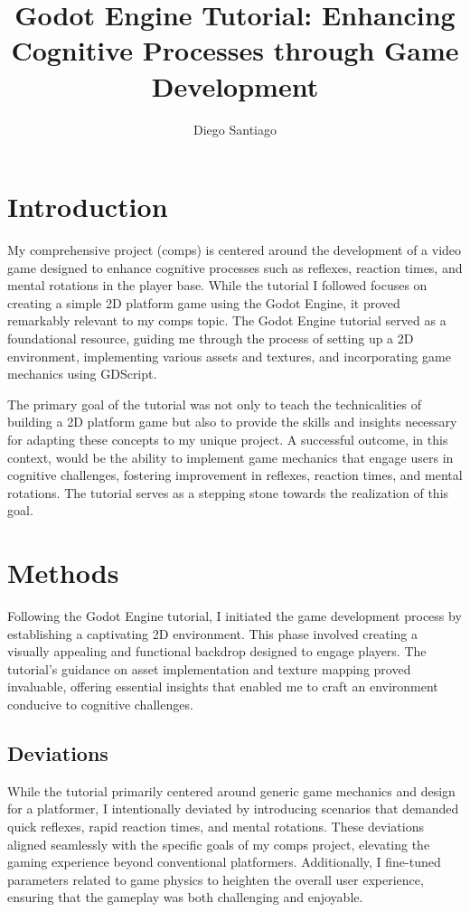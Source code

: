 \documentclass[10pt,twocolumn]{article}
\title{Godot Engine Tutorial: Enhancing Cognitive Processes through Game Development}
\author{Diego Santiago}
\affiliation{Occidental College}
\begin{document}
\maketitle

\section{Introduction}
My comprehensive project (comps) is centered around the development of a video game designed to enhance cognitive processes such as reflexes, reaction times, and mental rotations in the player base. While the tutorial I followed focuses on creating a simple 2D platform game using the Godot Engine, it proved remarkably relevant to my comps topic. The Godot Engine tutorial served as a foundational resource, guiding me through the process of setting up a 2D environment, implementing various assets and textures, and incorporating game mechanics using GDScript.

The primary goal of the tutorial was not only to teach the technicalities of building a 2D platform game but also to provide the skills and insights necessary for adapting these concepts to my unique project. A successful outcome, in this context, would be the ability to implement game mechanics that engage users in cognitive challenges, fostering improvement in reflexes, reaction times, and mental rotations. The tutorial serves as a stepping stone towards the realization of this goal.

\section{Methods}
Following the Godot Engine tutorial, I initiated the game development process by establishing a captivating 2D environment. This phase involved creating a visually appealing and functional backdrop designed to engage players. The tutorial's guidance on asset implementation and texture mapping proved invaluable, offering essential insights that enabled me to craft an environment conducive to cognitive challenges.
\subsection{Deviations}
While the tutorial primarily centered around generic game mechanics and design for a platformer, I intentionally deviated by introducing scenarios that demanded quick reflexes, rapid reaction times, and mental rotations. These deviations aligned seamlessly with the specific goals of my comps project, elevating the gaming experience beyond conventional platformers. Additionally, I fine-tuned parameters related to game physics to heighten the overall user experience, ensuring that the gameplay was both challenging and enjoyable.
\end{document}

